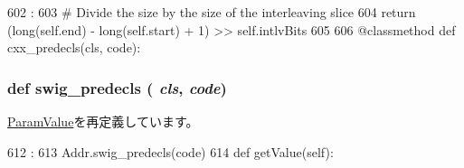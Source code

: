 \begin{DoxyCode}
602                   :
603         # Divide the size by the size of the interleaving slice
604         return (long(self.end) - long(self.start) + 1) >> self.intlvBits
605 
606     @classmethod
    def cxx_predecls(cls, code):
\end{DoxyCode}
\hypertarget{classm5_1_1params_1_1AddrRange_ab3dbcf5716623eac67a8ccc074fa7e13}{
\subsubsection[{swig\_\-predecls}]{\setlength{\rightskip}{0pt plus 5cm}def swig\_\-predecls ( {\em cls}, \/   {\em code})}}
\label{classm5_1_1params_1_1AddrRange_ab3dbcf5716623eac67a8ccc074fa7e13}


\hyperlink{classm5_1_1params_1_1ParamValue_ab3dbcf5716623eac67a8ccc074fa7e13}{ParamValue}を再定義しています。


\begin{DoxyCode}
612                                 :
613         Addr.swig_predecls(code)
614 
    def getValue(self):
\end{DoxyCode}


